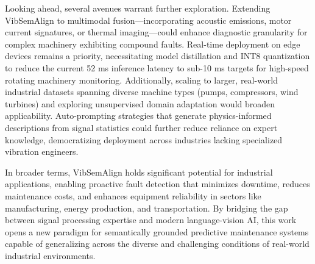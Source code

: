 Looking ahead, several avenues warrant further exploration. Extending VibSemAlign to multimodal fusion—incorporating acoustic emissions, motor current signatures, or thermal imaging—could enhance diagnostic granularity for complex machinery exhibiting compound faults. Real-time deployment on edge devices remains a priority, necessitating model distillation and INT8 quantization to reduce the current 52 ms inference latency to sub-10 ms targets for high-speed rotating machinery monitoring. Additionally, scaling to larger, real-world industrial datasets spanning diverse machine types (pumps, compressors, wind turbines) and exploring unsupervised domain adaptation would broaden applicability. Auto-prompting strategies that generate physics-informed descriptions from signal statistics could further reduce reliance on expert knowledge, democratizing deployment across industries lacking specialized vibration engineers.

In broader terms, VibSemAlign holds significant potential for industrial applications, enabling proactive fault detection that minimizes downtime, reduces maintenance costs, and enhances equipment reliability in sectors like manufacturing, energy production, and transportation. By bridging the gap between signal processing expertise and modern language-vision AI, this work opens a new paradigm for semantically grounded predictive maintenance systems capable of generalizing across the diverse and challenging conditions of real-world industrial environments.

